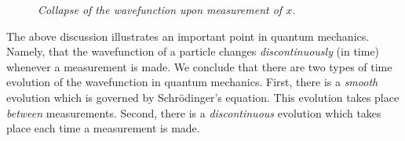 \begin{figure}
\centerline{}
\caption{\em Collapse of the wavefunction upon measurement of $x$.}\label{coll}   
\end{figure}

The above discussion illustrates an important point in quantum
mechanics. Namely, that the wavefunction of a particle
changes {\em discontinuously} (in time) whenever a measurement is made. We conclude that there are two types of time
evolution of the wavefunction in quantum mechanics. First, there is a {\em smooth}\/ evolution which is governed
by Schr\"{o}dinger's equation. This evolution takes place {\em between}\/ measurements. Second, there is a {\em discontinuous}\/ evolution which
takes place each time a measurement is made.

